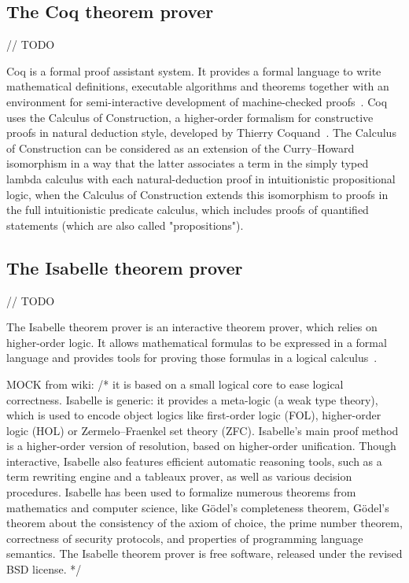 \documentclass[article]{aaltoseries}
\begin{document}

\subsection{The Coq theorem prover}
\label{sec:prover_coq}

// TODO

Coq is a formal proof assistant system. It provides a formal language to write mathematical definitions, executable algorithms and theorems together with an environment for semi-interactive development of machine-checked proofs~\cite{Coq}. Coq uses the Calculus of Construction, a higher-order formalism for constructive proofs in natural deduction style, developed by Thierry Coquand~\cite{Coq86}. The Calculus of Construction can be considered as an extension of the Curry–Howard isomorphism in a way that the latter associates a term in the simply typed lambda calculus with each natural-deduction proof in intuitionistic propositional logic, when the Calculus of Construction extends this isomorphism to proofs in the full intuitionistic predicate calculus, which includes proofs of quantified statements (which are also called "propositions").


\subsection{The Isabelle theorem prover}
\label{sec:prover_isabelle}

// TODO

The Isabelle theorem prover is an interactive theorem prover, which relies on higher-order logic. It allows mathematical formulas to be expressed in a formal language and provides tools for proving those formulas in a logical calculus~\cite{Isabelle}.

MOCK from wiki:
/* it is based on a small logical core to ease logical correctness. Isabelle is generic: it provides a meta-logic (a weak type theory), which is used to encode object logics like first-order logic (FOL), higher-order logic (HOL) or Zermelo–Fraenkel set theory (ZFC). Isabelle's main proof method is a higher-order version of resolution, based on higher-order unification. Though interactive, Isabelle also features efficient automatic reasoning tools, such as a term rewriting engine and a tableaux prover, as well as various decision procedures.
Isabelle has been used to formalize numerous theorems from mathematics and computer science, like Gödel's completeness theorem, Gödel's theorem about the consistency of the axiom of choice, the prime number theorem, correctness of security protocols, and properties of programming language semantics. The Isabelle theorem prover is free software, released under the revised BSD license.
*/
\end{document}

